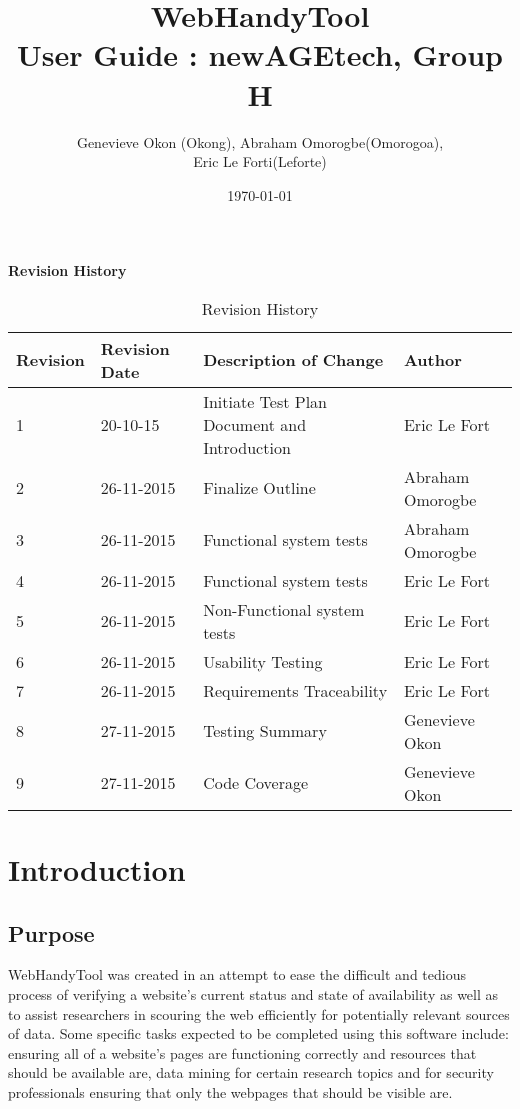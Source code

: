 \documentclass[12pt, titlepage]{article}
\begin{document}
\title{WebHandyTool \\
 User Guide : newAGEtech, Group H }
\author{Genevieve Okon (Okong), Abraham Omorogbe(Omorogoa),\\
 Eric Le Forti(Leforte)}
\date{\today}
\maketitle

\tableofcontents
\listoftables
\pagebreak

\begin{center}\textbf{Revision History}\end{center}
\begin{table}[h!]
\centering
	\begin{tabular}{| p{1.5cm} | p{2.5cm} | p{7cm} |p{3cm} |}    \hline
	Revision  &Revision Date &Description of Change &Author\\ \hline
	1& 20-10-15 &Initiate Test Plan Document  and Introduction&Eric Le Fort\\ \hline
	2&26-11-2015&Finalize Outline & Abraham Omorogbe\\ \hline	
3&26-11-2015&Functional system tests& Abraham Omorogbe\\ \hline
4&26-11-2015&Functional system tests& Eric Le Fort\\ \hline
5&26-11-2015&Non-Functional system tests& Eric Le Fort\\ \hline
6 &26-11-2015&Usability Testing & Eric Le Fort\\ \hline
7& 26-11-2015& Requirements Traceability & Eric Le Fort\\ \hline
8& 27-11-2015 &Testing Summary& Genevieve Okon\\ \hline
9& 27-11-2015 &Code Coverage& Genevieve Okon\\ \hline

	
       \end{tabular}
       \caption{Revision History}
       \label{table:Revision History}
\end{table}
\pagebreak
\section{Introduction}
\subsection{Purpose}
WebHandyTool was created in an attempt to ease the difficult and tedious process of verifying a website's current status and state of availability as well as to assist researchers in scouring the web efficiently for potentially relevant sources of data. Some specific tasks expected to be completed using this software include: ensuring all of a website's pages are functioning correctly and resources that should be available are, data mining for certain research topics and for security professionals ensuring that only the webpages that should be visible are. 
\end{document}
